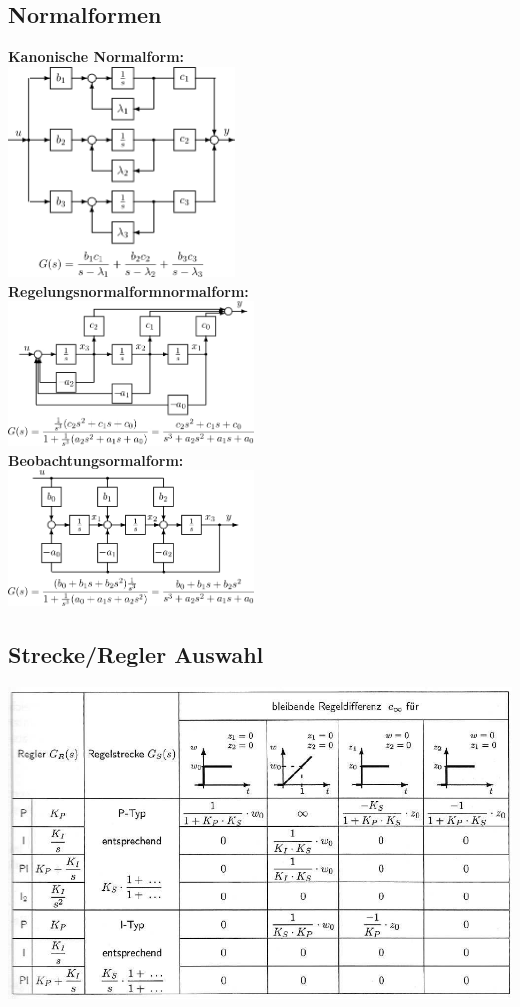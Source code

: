 \documentclass[fs, footer]{latex4ei}
\begin{document}
\begin{multicols*}{4}
\subsection{Normalformen}
\textbf{Kanonische Normalform:}\\
\includegraphics[width = 6cm]{./img/kanonischenormalform.jpg}\\
\textbf{Regelungsnormalformnormalform:}\\
\includegraphics[width = 6.5cm]{./img/regelnormalform.jpg}\\
\textbf{Beobachtungsormalform:}\\
\includegraphics[width = 6.5cm]{./img/beobachternormalform.jpg}

\columnbreak


\subsection{Strecke/Regler Auswahl}
\includegraphics[width = 14cm]{./img/reglerstrecke.pdf}



\end{multicols*}
\end{document}
